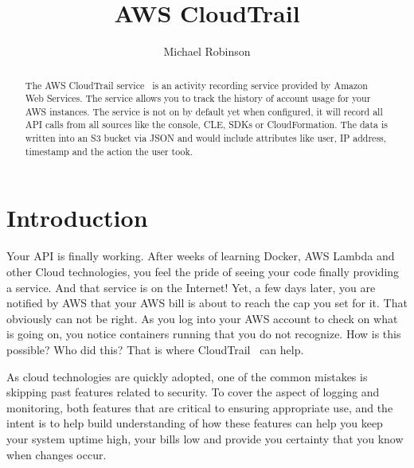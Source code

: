 
\title{AWS CloudTrail}

\author{Michael Robinson}


\renewcommand{\shortauthors}{M. Robinson}


\begin{abstract}
The AWS CloudTrail service~\cite{hid-sp18-518-CloudTrail} is an activity 
recording service provided by Amazon Web Services. The service allows you to 
track the history of account usage for your AWS instances. The service is not 
on by default yet when configured, it will record all API calls from all 
sources like the console, CLE, SDKs or CloudFormation. The data is written 
into an S3 bucket via JSON and would include attributes like user, IP address, 
timestamp and the action the user took.
\end{abstract}


\maketitle

\section{Introduction}

Your API is finally working. After weeks of learning Docker, AWS Lambda and 
other Cloud technologies, you feel the pride of seeing your code finally 
providing a service. And that service is on the Internet! Yet, a few days 
later, you are notified by AWS that your AWS bill is about to reach the cap 
you set for it. That obviously can not be right. As you log into your AWS 
account to check on what is going on, you notice containers running that you 
do not recognize. How is this possible? Who did this? That is where 
CloudTrail~\cite{hid-sp18-518-CloudTrail} can help.

As cloud technologies are quickly adopted, one of the common mistakes is 
skipping past features related to security. To cover the aspect of
logging and monitoring, both features that are critical to ensuring 
appropriate use, and the intent is to help build understanding of how these 
features can help you keep your system uptime high, your bills low and provide 
you certainty that you know when changes occur.

